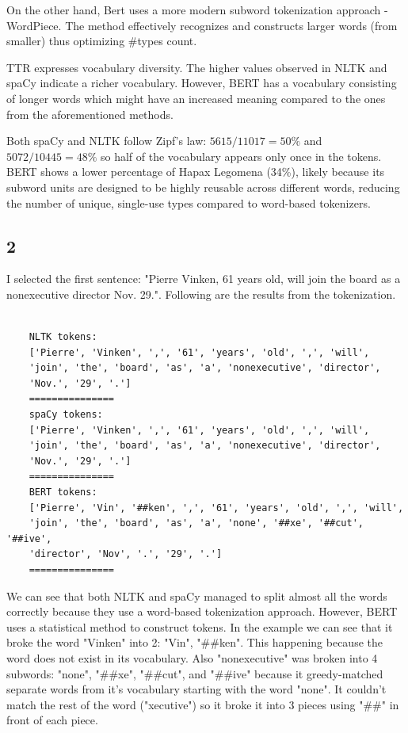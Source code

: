 \documentclass[8pt,a4paper]{report}%
\begin{document}
On the other hand, Bert uses a more modern subword tokenization approach - WordPiece. The method effectively recognizes and constructs larger words (from smaller) thus optimizing \#types count.

TTR expresses vocabulary diversity. The higher values observed in NLTK and spaCy indicate a richer vocabulary. However, BERT has a vocabulary consisting of longer words which might have an increased meaning compared to the ones from the aforementioned methods.

Both spaCy and NLTK follow Zipf's law:
$5615/11017=50\%$ and $5072/10445=48\%$ so half of the vocabulary appears only once in the tokens. BERT shows a lower percentage of Hapax Legomena (34\%), likely because its subword units are designed to be highly reusable across different words, reducing the number of unique, single-use types compared to word-based tokenizers.

\subsection*{2}

I selected the first sentence: "Pierre Vinken, 61 years old, will join the board as a nonexecutive director Nov. 29.". Following are the results from the tokenization.

\begin{lstlisting}

    NLTK tokens:
    ['Pierre', 'Vinken', ',', '61', 'years', 'old', ',', 'will',
    'join', 'the', 'board', 'as', 'a', 'nonexecutive', 'director',
    'Nov.', '29', '.']
    ===============
    spaCy tokens:
    ['Pierre', 'Vinken', ',', '61', 'years', 'old', ',', 'will',
    'join', 'the', 'board', 'as', 'a', 'nonexecutive', 'director',
    'Nov.', '29', '.']
    ===============
    BERT tokens:
    ['Pierre', 'Vin', '##ken', ',', '61', 'years', 'old', ',', 'will',
    'join', 'the', 'board', 'as', 'a', 'none', '##xe', '##cut', '##ive',
    'director', 'Nov', '.', '29', '.']
    ===============

\end{lstlisting}

We can see that both NLTK and spaCy managed to split almost all the words correctly because they use a word-based tokenization approach. However, BERT uses a statistical method to construct tokens. In the example we can see that it broke the word "Vinken" into 2: "Vin", "\#\#ken". This happening because the word does not exist in its vocabulary. Also "nonexecutive" was broken into 4 subwords: "none", "\#\#xe", "\#\#cut", and "\#\#ive" because it greedy-matched separate words from it's vocabulary starting with the word "none". It couldn't match the rest of the word ("xecutive") so it broke it into 3 pieces using "\#\#" in front of each piece.
\end{document}
